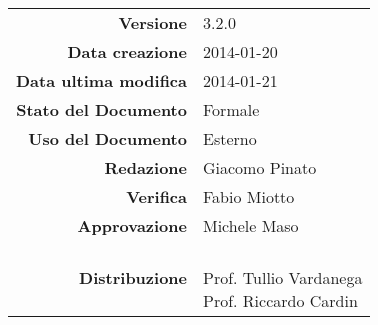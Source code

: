 
\newcommand{\Versione}{3.2.0}						%
\newcommand{\Data}{2014-01-20}						%
\newcommand{\DataUltimaModifica}{2014-01-21}
\newcommand{\TipoDocumento}{Verbale esterno 2014-01-20}		%




\begin{center}
\begin{tabular}{r|l}
\textbf{Versione} & \Versione{} \\
\textbf{Data creazione} & \Data{} \\
\textbf{Data ultima modifica} & \DataUltimaModifica{} \\
\textbf{Stato del Documento} & Formale \\		%
\textbf{Uso del Documento} & Esterno \\			%
\textbf{Redazione} & Giacomo Pinato\\				%
\textbf{Verifica} & Fabio Miotto\\		%
\textbf{Approvazione} & Michele Maso\\		%
\textbf{Distribuzione} & \parbox[t]{4cm}{\NomeGruppo{} \\Prof. Tullio Vardanega \\ Prof. Riccardo Cardin \\ \Prop{} }\\
\end{tabular}
\end{center}

\vspace{0.05in}

\begin{abstract}
\begin{center}
Verbale della riunione tra i componenti del gruppo \NomeGruppo{} per il progetto \\ \Progetto{}, avvenuta in data 2014-01-20.
\end{center}
\end{abstract}

